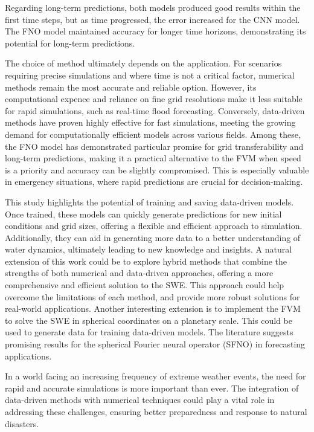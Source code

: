 Regarding long-term predictions, both models produced good results within the first time steps, but as time progressed, the error increased for the CNN model.
The FNO model maintained accuracy for longer time horizons, demonstrating its potential for long-term predictions.

The choice of method ultimately depends on the application.
For scenarios requiring precise simulations and where time is not a critical factor, numerical methods remain the most accurate and reliable option.
However, its computational expence and reliance on fine grid resolutions make it less suitable for rapid simulations, such as real-time flood forecasting.
Conversely, data-driven methods have proven highly effective for fast simulations, meeting the growing demand for computationally efficient models across various fields.
Among these, the FNO model has demonstrated particular promise for grid transferability and long-term predictions, making it a practical alternative to the FVM when speed is a priority and accuracy can be slightly compromised.
This is especially valuable in emergency situations, where rapid predictions are crucial for decision-making.

This study highlights the potential of training and saving data-driven models.
Once trained, these models can quickly generate predictions for new initial conditions and grid sizes, offering a flexible and efficient approach to simulation.
Additionally, they can aid in generating more data to a better understanding of water dynamics, ultimately leading to new knowledge and insights.
A natural extension of this work could be to explore hybrid methods that combine the strengths of both numerical and data-driven approaches, offering a more comprehensive and efficient solution to the SWE.
This approach could help overcome the limitations of each method, and provide more robust solutions for real-world applications.
Another interesting extension is to implement the FVM to solve the SWE in spherical coordinates on a planetary scale.
This could be used to generate data for training data-driven models.
The literature suggests promising results for the spherical Fourier neural operator (SFNO) in forecasting applications.

In a world facing an increasing frequency of extreme weather events, the need for rapid and accurate simulations is more important than ever.
The integration of data-driven methods with numerical techniques could play a vital role in addressing these challenges, ensuring better preparedness and response to natural disasters. 
